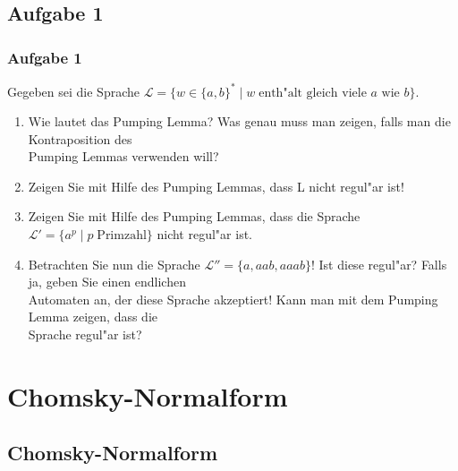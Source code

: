 \subsection{Aufgabe 1}
\begin{frame}
	\frametitle{Aufgabe 1}
	Gegeben sei die Sprache $\mathcal{L} = \{w \in \{a,b\}^* \; | \; w \;
	\mbox{enth"alt gleich viele $a$ wie $b$}\}$.
	\begin{enumerate}
		\item Wie lautet das Pumping Lemma? Was genau muss man zeigen, falls man die
		Kontraposition des\\
		Pumping Lemmas verwenden will?
		\item Zeigen Sie mit Hilfe des Pumping Lemmas, dass L nicht regul"ar ist!
		\item Zeigen Sie mit Hilfe des Pumping Lemmas, dass die Sprache $\mathcal{L}' =
		\{a^p\; | \; p \; \mbox{Primzahl}\}$ nicht regul"ar ist.
		\item Betrachten Sie nun die Sprache $\mathcal{L}'' = \{a,aab,aaab\}$! Ist diese
		regul"ar? Falls ja, geben Sie einen endlichen\\
		Automaten an, der diese Sprache akzeptiert! Kann man mit dem Pumping Lemma zeigen,
		dass die\\
		Sprache regul"ar ist?
	\end{enumerate}
\end{frame}

\section{Chomsky-Normalform}
\subsection{Chomsky-Normalform}


